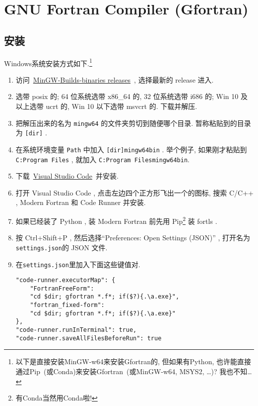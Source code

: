 \section[GNU Fortran Compiler]{GNU Fortran Compiler (Gfortran)}

\subsection{安装}

Windows系统安装方式如下.\footnote{
    以下是直接安装MinGW-w64来安装Gfortran的, 但如果有Python, 也许能直接通过Pip~(或Conda)来安装Gfortran~(或MinGW-w64, MSYS2, \dots)? 我也不知\dots
}
\begin{enumerate}
    \item 访问~\href{https://github.com/niXman/mingw-builds-binaries/releases}
    {MinGW-Builds-binaries releases}~, 选择最新的 release 进入.
    \item 选带 posix 的; 64 位系统选带 x86\_{}64 的, 32 位系统选带 i686 的; Win 10 及以上选带 ucrt 的, Win 10 以下选带 msvcrt 的. 下载并解压.
    \item 把解压出来的名为 \texttt{mingw64} 的文件夹剪切到随便哪个目录. 暂称粘贴到的目录为 \texttt{[dir]} .
    \item 在系统环境变量 \texttt{Path} 中加入 \texttt{[dir]\bs{}mingw64\bs{}bin} . 举个例子, 如果刚才粘贴到 \texttt{C:\bs{}Program Files} , 就加入 \texttt{C:\bs{}Program Files\bs{}mingw64\bs{}bin}.
    \item 下载~\href{https://code.visualstudio.com/sha/download?build=stable&os=win32-x64-user}
    {Visual Studio Code}~并安装.
    \item 打开 Visual Studio Code , 点击左边四个正方形飞出一个的图标, 搜索 C/C++ , Modern Fortran 和 Code Runner 并安装.
    \item[] 如果已经装了 Python , 装 Modern Fortran 前先用 Pip\footnote{有Conda当然用Conda啦!} 装 fortls .
    \item 按 Ctrl+Shift+P , 然后选择``Preferences: Open Settings (JSON)'' , 打开名为\texttt{settings.json}的 JSON 文件.
    \item 在\texttt{settings.json}里加入下面这些键值对.\label{add_key_value}
    \begin{verbatim}
"code-runner.executorMap": {
    "FortranFreeForm":
    "cd $dir; gfortran *.f*; if($?){.\a.exe}",
    "fortran_fixed-form":
    "cd $dir; gfortran *.f*; if($?){.\a.exe}"
},
"code-runner.runInTerminal": true,
"code-runner.saveAllFilesBeforeRun": true
    \end{verbatim}
\end{enumerate}
